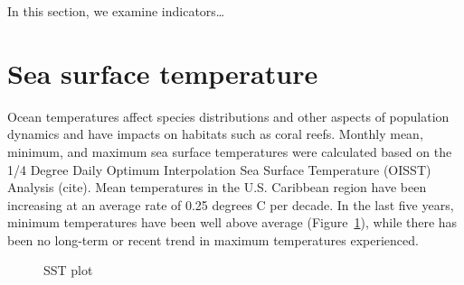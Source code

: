 \documentclass[
  letterpaper,
  oneside,
  open=any]{scrbook}
\begin{document}
In this section, we examine indicators\ldots{}

\section{Sea surface temperature}\label{sea-surface-temperature}

Ocean temperatures affect species distributions and other aspects of
population dynamics and have impacts on habitats such as coral reefs.
Monthly mean, minimum, and maximum sea surface temperatures were
calculated based on the 1/4 Degree Daily Optimum Interpolation Sea
Surface Temperature (OISST) Analysis (cite). Mean temperatures in the
U.S. Caribbean region have been increasing at an average rate of 0.25
degrees C per decade. In the last five years, minimum temperatures have
been well above average (Figure~\ref{fig-SST}), while there has been no
long-term or recent trend in maximum temperatures experienced.

\begin{figure}


\caption{\label{fig-SST}SST plot}

\end{figure}%
\end{document}
